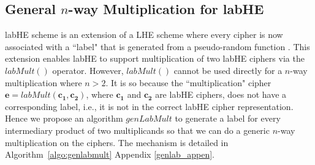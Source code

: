   \vspace{-0.2cm} \subsection{\textbf{General $n$-way Multiplication for \textsf{labHE}}}\label{genlab}
\textsf{labHE} scheme is an extension of a \textsf{LHE} scheme where every cipher is now associated with a ``label" that is generated from a pseudo-random function \cite{Barbosa2017LabeledHE}. This extension enables \textsf{labHE} to support multiplication of two \textsf{labHE} ciphers via the $labMult()$ operator.  
However, $labMult()$ cannot be used directly for a $n$-way multiplication where $n>2$.  It is so because the ``multiplication" cipher $\mathbf{e}=labMult(\mathbf{c_1},\mathbf{c_2})$, where $\mathbf{c_1}$ and $\mathbf{c_2}$ are \textsf{labHE} ciphers, does not have a corresponding label, i.e., it is not in the correct \textsf{labHE} cipher representation. Hence we propose an algorithm $genLabMult$ to generate a label for every intermediary product of two multiplicands so that we can do a generic $n$-way multiplication on the ciphers. The mechanism is detailed in Algorithm~\ref{algo:genlabmult} Appendix \ref{genlab_appen}. %
